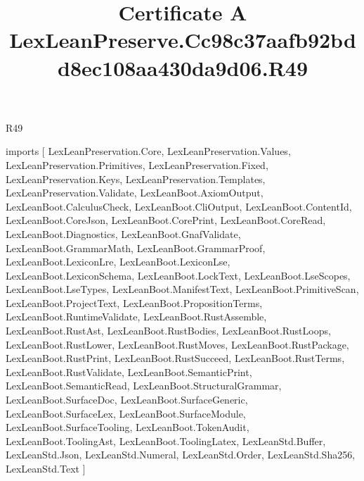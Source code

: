 \begin{lexlean}{R49}
\title{Certificate A LexLeanPreserve.Cc98c37aafb92bdd8ec108aa430da9d06.R49}
\begin{coremodule}
imports [
  LexLeanPreservation.Core,
  LexLeanPreservation.Values,
  LexLeanPreservation.Primitives,
  LexLeanPreservation.Fixed,
  LexLeanPreservation.Keys,
  LexLeanPreservation.Templates,
  LexLeanPreservation.Validate,
  LexLeanBoot.AxiomOutput,
  LexLeanBoot.CalculusCheck,
  LexLeanBoot.CliOutput,
  LexLeanBoot.ContentId,
  LexLeanBoot.CoreJson,
  LexLeanBoot.CorePrint,
  LexLeanBoot.CoreRead,
  LexLeanBoot.Diagnostics,
  LexLeanBoot.GnafValidate,
  LexLeanBoot.GrammarMath,
  LexLeanBoot.GrammarProof,
  LexLeanBoot.LexiconLre,
  LexLeanBoot.LexiconLse,
  LexLeanBoot.LexiconSchema,
  LexLeanBoot.LockText,
  LexLeanBoot.LseScopes,
  LexLeanBoot.LseTypes,
  LexLeanBoot.ManifestText,
  LexLeanBoot.PrimitiveScan,
  LexLeanBoot.ProjectText,
  LexLeanBoot.PropositionTerms,
  LexLeanBoot.RuntimeValidate,
  LexLeanBoot.RustAssemble,
  LexLeanBoot.RustAst,
  LexLeanBoot.RustBodies,
  LexLeanBoot.RustLoops,
  LexLeanBoot.RustLower,
  LexLeanBoot.RustMoves,
  LexLeanBoot.RustPackage,
  LexLeanBoot.RustPrint,
  LexLeanBoot.RustSucceed,
  LexLeanBoot.RustTerms,
  LexLeanBoot.RustValidate,
  LexLeanBoot.SemanticPrint,
  LexLeanBoot.SemanticRead,
  LexLeanBoot.StructuralGrammar,
  LexLeanBoot.SurfaceDoc,
  LexLeanBoot.SurfaceGeneric,
  LexLeanBoot.SurfaceLex,
  LexLeanBoot.SurfaceModule,
  LexLeanBoot.SurfaceTooling,
  LexLeanBoot.TokenAudit,
  LexLeanBoot.ToolingAst,
  LexLeanBoot.ToolingLatex,
  LexLeanStd.Buffer,
  LexLeanStd.Json,
  LexLeanStd.Numeral,
  LexLeanStd.Order,
  LexLeanStd.Sha256,
  LexLeanStd.Text
]


\end{coremodule}
\end{lexlean}
